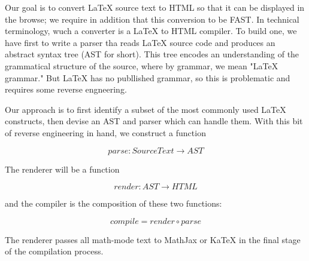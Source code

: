 Our goal is to convert LaTeX source text to HTML so that it can be displayed in the browse; we require in addition that this conversion to be FAST.  In technical terminology, wuch a converter is a LaTeX to HTML compiler.  To build one, we have first to write a parser tha reads LaTeX source code and produces an abstract syntax tree (AST for short).  This tree encodes an understanding of the grammatical structure of the source, where by grammar, we mean "LaTeX grammar."  But LaTeX has no publlished grammar, so this is problematic and requires some reverse engneering.

Our approach is to first identify a subset of the most commonly used LaTeX constructs, then devise an AST and parser which can handle them.  With this bit of reverse engineering in hand,  we construct a function

$$
parse : Source Text \to AST
$$

The renderer will be a function 

$$
render : AST \to HTML
$$

and the compiler is the composition of these two functions:

$$ 
compile = render \circ parse
$$

The renderer passes all math-mode text to MathJax or KaTeX in the final stage of the compilation process.





